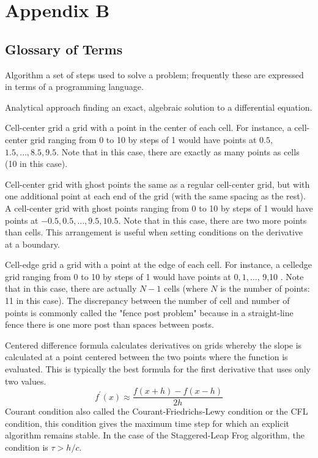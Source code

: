 
\chapter*{Appendix B}
\section*{Glossary of Terms}

Algorithm a set of steps used to solve a problem; frequently these are expressed in terms of a programming language.

Analytical approach finding an exact, algebraic solution to a differential equation.

Cell-center grid a grid with a point in the center of each cell. For instance, a cell-center grid ranging from 0 to 10 by steps of 1 would have points at $0.5$, $1.5, \ldots, 8.5,9.5$. Note that in this case, there are exactly as many points as cells (10 in this case).

Cell-center grid with ghost points the same as a regular cell-center grid, but with one additional point at each end of the grid (with the same spacing as the rest). A cell-center grid with ghost points ranging from 0 to 10 by steps of 1 would have points at $-0.5,0.5, \ldots, 9.5,10.5$. Note that in this case, there are two more points than cells. This arrangement is useful when setting conditions on the derivative at a boundary.

Cell-edge grid a grid with a point at the edge of each cell. For instance, a celledge grid ranging from 0 to 10 by steps of 1 would have points at $0,1, \ldots$, 9,10 . Note that in this case, there are actually $N-1$ cells (where $N$ is the number of points: 11 in this case). The discrepancy between the number of cell and number of points is commonly called the "fence post problem" because in a straight-line fence there is one more post than spaces between posts.

Centered difference formula calculates derivatives on grids whereby the slope is calculated at a point centered between the two points where the function is evaluated. This is typically the best formula for the first derivative that uses only two values.
$$
f^{\prime}(x) \approx \frac{f(x+h)-f(x-h)}{2 h}
$$
Courant condition also called the Courant-Friedrichs-Lewy condition or the CFL condition, this condition gives the maximum time step for which an explicit algorithm remains stable. In the case of the Staggered-Leap Frog algorithm, the condition is $\tau>h / c$.

